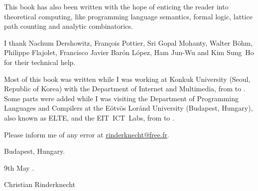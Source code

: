 This book has also been written with the hope of enticing the reader
into theoretical computing, like programming language semantics,
formal logic, lattice path counting and analytic combinatorics.

I thank Nachum Dershowitz, Fran\c{c}ois Pottier, Sri Gopal Mohanty,
Walter B\"ohm, Philippe Flajolet, Francisco Javier Bar\'on L\'opez,
Ham Jun-Wu and Kim Sung~Ho for their technical help.

Most of this book was written while I was working at Konkuk University
(Seoul, Republic of Korea) with the Department of Internet and
Multimedia, from  to . Some
parts were added while I was visiting the Department of Programming
Languages and Compilers at the E\"otv\"os Lor\'and University
(Budapest, Hungary), also known as ELTE, and the EIT~ICT~Labs, from
 to .

Please inform me of any error at \url{rinderknecht@free.fr}.

\bigskip

\hfill{}Budapest, Hungary.


\hfill{}9th May .

\bigskip

\hfill{}Christian Rinderknecht
